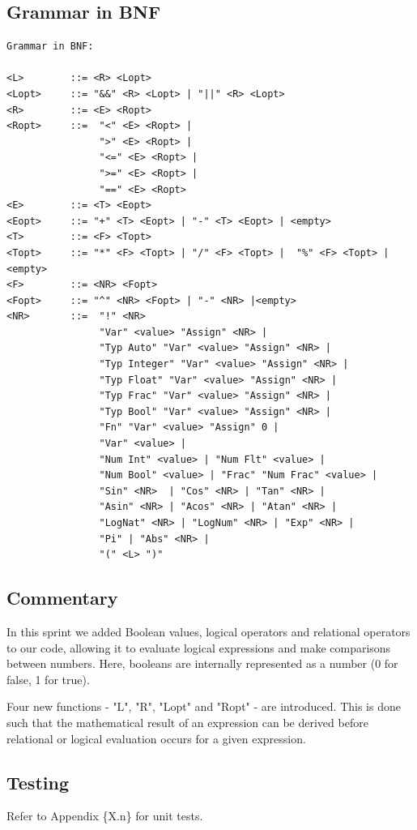 \documentclass[a4paper, oneside, 11pt]{report}
\begin{document}
    \subsection{Grammar in BNF}
    \begin{verbatim}
Grammar in BNF:

<L>        ::= <R> <Lopt>
<Lopt>     ::= "&&" <R> <Lopt> | "||" <R> <Lopt>
<R>        ::= <E> <Ropt>
<Ropt>     ::=  "<" <E> <Ropt> |
                ">" <E> <Ropt> |
                "<=" <E> <Ropt> |
                ">=" <E> <Ropt> |
                "==" <E> <Ropt>
<E>        ::= <T> <Eopt>
<Eopt>     ::= "+" <T> <Eopt> | "-" <T> <Eopt> | <empty>
<T>        ::= <F> <Topt>
<Topt>     ::= "*" <F> <Topt> | "/" <F> <Topt> |  "%" <F> <Topt> |<empty>
<F>        ::= <NR> <Fopt>
<Fopt>     ::= "^" <NR> <Fopt> | "-" <NR> |<empty>
<NR>       ::=  "!" <NR>
                "Var" <value> "Assign" <NR> |
                "Typ Auto" "Var" <value> "Assign" <NR> |
                "Typ Integer" "Var" <value> "Assign" <NR> |
                "Typ Float" "Var" <value> "Assign" <NR> |
                "Typ Frac" "Var" <value> "Assign" <NR> |
                "Typ Bool" "Var" <value> "Assign" <NR> |
                "Fn" "Var" <value> "Assign" 0 |
                "Var" <value> |
                "Num Int" <value> | "Num Flt" <value> |
                "Num Bool" <value> | "Frac" "Num Frac" <value> |
                "Sin" <NR>  | "Cos" <NR> | "Tan" <NR> |
                "Asin" <NR> | "Acos" <NR> | "Atan" <NR> |
                "LogNat" <NR> | "LogNum" <NR> | "Exp" <NR> |
                "Pi" | "Abs" <NR> |
                "(" <L> ")"
    \end{verbatim}
    \subsection{Commentary}
    In this sprint we added Boolean values, logical operators and relational operators to our code, allowing it to evaluate logical expressions and make comparisons between numbers. Here, booleans are internally represented as a number (0 for false, 1 for true).

    Four new functions - "L", "R", "Lopt" and "Ropt" - are introduced. This is done such that the mathematical result of an expression can be derived before relational or logical evaluation occurs for a given expression.

    \subsection{Testing}
    Refer to Appendix \{X.n\} for unit tests.
\end{document}
